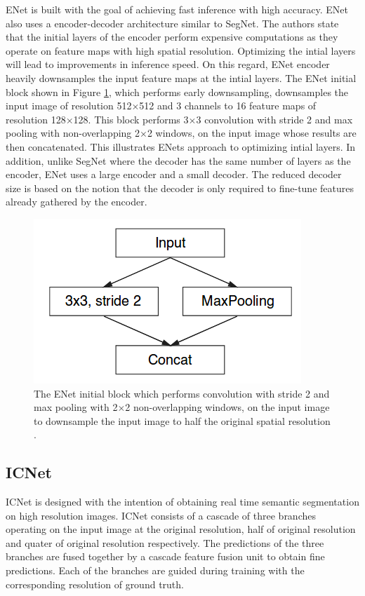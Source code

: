 ENet \cite{DBLP:journals/corr/PaszkeCKC16} is built with the goal of achieving fast inference with high accuracy. ENet also uses a encoder-decoder architecture similar to SegNet. The authors state that the initial layers of the encoder perform expensive computations as they operate on feature maps with high spatial resolution. Optimizing the intial layers will lead to improvements in inference speed. On this regard, ENet encoder heavily downsamples the input feature maps at the intial layers. The ENet initial block shown in Figure \ref{Fig:enet}, which performs early downsampling, downsamples the input image of resolution 512$\times$512 and 3 channels to 16 feature maps of resolution 128$\times$128. This block performs 3$\times$3 convolution with stride 2 and max pooling with non-overlapping 2$\times$2 windows, on the input image whose results are then concatenated. This illustrates ENets approach to optimizing intial layers. In addition, unlike SegNet where the decoder has the same number of layers as the encoder, ENet uses a large encoder and a small decoder. The reduced decoder size is based on the notion that the decoder is only required to fine-tune features already gathered by the encoder. 

	\begin{figure}
		\centering
		\includegraphics[width=.4\linewidth]{images/enet}
		\caption{The ENet initial block which performs convolution with stride 2 and max pooling with 2$\times$2 non-overlapping windows, on the input image to downsample the input image to half the original spatial resolution \cite{DBLP:journals/corr/PaszkeCKC16}.}
		\label{Fig:enet}
	\end{figure}

\subsection{ICNet}

ICNet \cite{DBLP:journals/corr/ZhaoQSSJ17} is designed with the intention of obtaining real time semantic segmentation on high resolution images. ICNet consists of a cascade of three branches operating on the input image at the original resolution, half of original resolution and quater of original resolution respectively. The predictions of the three branches are fused together by a cascade feature fusion unit to obtain fine predictions. Each of the branches are guided during training with the corresponding resolution of ground truth. 

